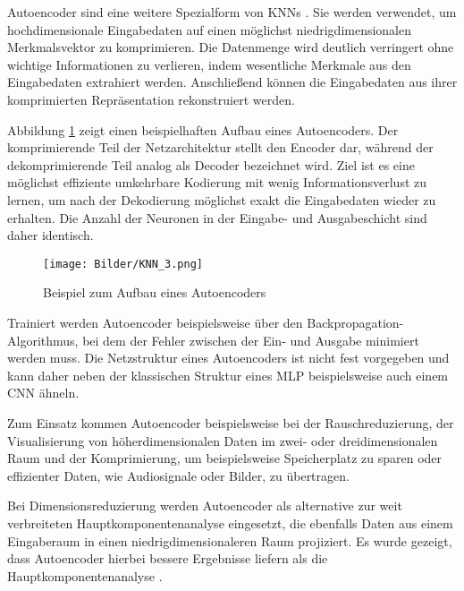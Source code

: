 Autoencoder sind eine weitere Spezialform von KNNs \cite{Bard2019}. Sie werden verwendet, um hochdimensionale Eingabedaten auf einen möglichst niedrigdimensionalen Merkmalsvektor zu komprimieren. Die Datenmenge wird deutlich verringert ohne wichtige Informationen zu verlieren, indem wesentliche Merkmale aus den Eingabedaten extrahiert werden. Anschließend können die Eingabedaten aus ihrer komprimierten Repräsentation rekonstruiert werden. 

Abbildung \ref{fig:autoencoder} zeigt einen beispielhaften Aufbau eines Autoencoders. Der kom\-pri\-mie\-ren\-de Teil der Netzarchitektur stellt den Encoder dar, während der dekomprimierende Teil analog als Decoder bezeichnet wird. Ziel ist es eine möglichst effiziente umkehrbare Kodierung mit wenig Informationsverlust zu lernen, um nach der Dekodierung möglichst exakt die Eingabedaten wieder zu erhalten. Die Anzahl der Neuronen in der Eingabe- und Ausgabeschicht sind daher identisch.

\begin{figure}
    \centering
    \texttt{[image: Bilder/KNN\_3.png]}
    \caption{Beispiel zum Aufbau eines Autoencoders}
    \label{fig:autoencoder}
\end{figure}

Trainiert werden Autoencoder beispielsweise über den Backpropagation-Algorithmus, bei dem der Fehler zwischen der Ein- und Ausgabe minimiert werden muss. Die Netzstruktur eines Autoencoders ist nicht fest vorgegeben und kann daher neben der klassischen Struktur eines MLP beispielsweise auch einem CNN ähneln.
 
Zum Einsatz kommen Autoencoder beispielsweise bei der Rauschreduzierung, der Visualisierung von höherdimensionalen Daten im zwei- oder dreidimensionalen Raum und der Komprimierung, um beispielsweise Speicherplatz zu sparen oder effizienter Daten, wie Audiosignale oder Bilder, zu übertragen. 

Bei Dimensionsreduzierung werden Autoencoder als alternative zur weit verbreiteten  Hauptkomponentenanalyse eingesetzt, die ebenfalls Daten aus einem Eingaberaum in einen niedrigdimensionaleren Raum projiziert.
Es wurde gezeigt, dass Autoencoder hierbei bessere Ergebnisse liefern als die Hauptkomponentenanalyse \cite{Hinton2006}. 

